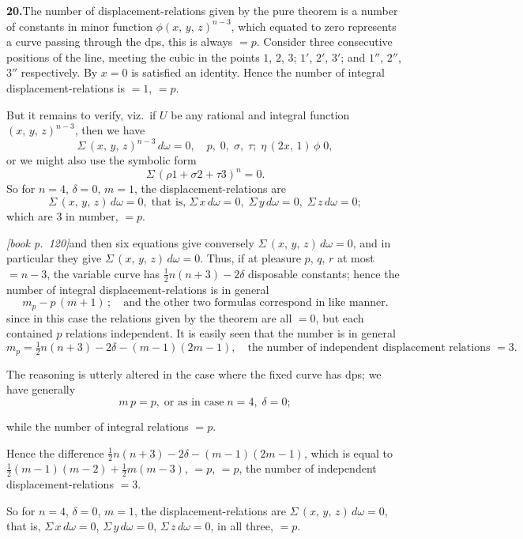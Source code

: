 \documentclass[11pt,a4paper]{article}
\theoremstyle{plain}
\theoremstyle{definition}
\theoremstyle{remark}
\begin{document}
\medskip\noindent\textbf{20.}\quad The number of displacement-relations given by the pure theorem is a number of constants in minor function $\phi(x,\,y,\,z)^{n-3}$, which equated to zero represents a curve passing through the dps, this is always $= p$. Consider three consecutive positions of the line, meeting the cubic in the points $1$, $2$, $3$; $1'$, $2'$, $3'$; and $1''$, $2''$, $3''$ respectively. By $x = 0$ is satisfied an identity. Hence the number of integral displacement-relations is $= 1$, $= p$.

But it remains to verify, viz.\ if $U$ be any rational and integral function $(x,\,y,\,z)^{n-3}$, then we have
\[
\Sigma\,(x,\,y,\,z)^{n-3}\,d\omega = 0,\quad p,\;0,\;\sigma,\;\tau;\;\eta\,(2x,\,1)\,\phi\;0,
\]
or we might also use the symbolic form
\[
\Sigma\,(\rho 1 + \sigma 2 + \tau 3)^n = 0.
\]
So for $n = 4$, $\delta = 0$, $m = 1$, the displacement-relations are
\[
\Sigma\,(x,\,y,\,z)\,d\omega = 0,\;\text{that is,}\;\Sigma\,x\,d\omega = 0,\;\Sigma\,y\,d\omega = 0,\;\Sigma\,z\,d\omega = 0;
\]
which are 3 in number, $= p$.

\noindent\textit{[book p.~120]}\quad and then six equations give conversely $\Sigma\,(x,\,y,\,z)\,d\omega = 0$, and in particular they give $\Sigma\,(x,\,y,\,z)\,d\omega = 0$. Thus, if at pleasure $p$, $q$, $r$ at most $= n - 3$, the variable curve has $\tfrac{1}{2}n(n + 3) - 2\delta$ disposable constants; hence the number of integral displacement-relations is in general
\[
m_p - p\,(m + 1)\,;\quad \text{and the other two formulas correspond in like manner.}
\]
since in this case the relations given by the theorem are all $= 0$, but each contained $p$ relations independent. It is easily seen that the number is in general
\[
m_p = \tfrac{1}{2}n(n + 3) - 2\delta - (m - 1)(2m - 1),\quad \text{the number of independent displacement relations $= 3$.}
\]

The reasoning is utterly altered in the case where the fixed curve has dps; we have generally
\[
m\,p = p,\;\text{or as in case}\;n = 4,\;\delta = 0;
\]

while the number of integral relations $= p$.

Hence the difference $\tfrac{1}{2}n(n + 3) - 2\delta - (m - 1)(2m - 1)$, which is equal to $\tfrac{1}{2}(m - 1)(m - 2) + \tfrac{1}{2}m(m - 3)$, $= p$, $= p$, the number of independent displacement-relations $= 3$.

So for $n = 4$, $\delta = 0$, $m = 1$, the displacement-relations are $\Sigma\,(x,\,y,\,z)\,d\omega = 0$, that is, $\Sigma\,x\,d\omega = 0$, $\Sigma\,y\,d\omega = 0$, $\Sigma\,z\,d\omega = 0$, in all three, $= p$.
\end{document}
